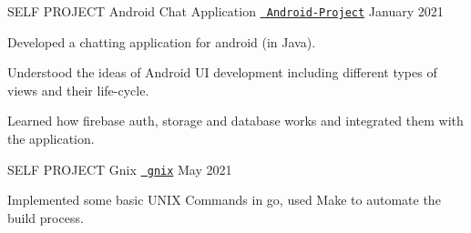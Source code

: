 \begin{cventries}
  \cventry
  {SELF PROJECT}
  {Android Chat Application}
  {\texttt{\href{https://github.com/abhishekshree/Android-Project}{\faGithub{} Android-Project}}}
  {January 2021}
  {
    \begin{cvitems}
      \item Developed a chatting application for android (in Java).
      \item Understood the ideas of Android UI development including different types of views and their life-cycle.
      \item Learned how firebase auth, storage and database works and integrated them with the application.
    \end{cvitems}
  }
 \vspace{0.2cm}
  
  \cventry
  {SELF PROJECT}
  {Gnix}
  {\texttt{\href{https://github.com/abhishekshree/gnix}{\faGithub{} gnix}}}
  {May 2021}
  {
    \begin{cvitems}
      \item Implemented some basic UNIX Commands in go, used Make to automate the build process.
    \end{cvitems}
  }
 \vspace{0.2cm}
\end{cventries}

